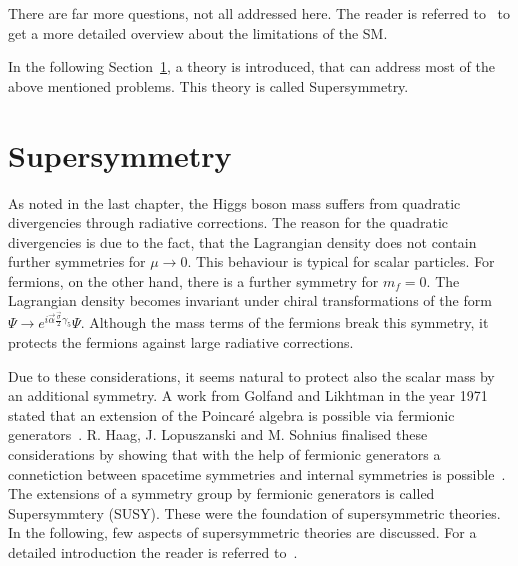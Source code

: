 There are far more questions, not all addressed here.
The reader is referred to~\cite{FIXME} to get a more detailed overview about the limitations of the SM.

In the following Section~\ref{sec:Supersymmetry}, a theory is introduced, that can address most of the above mentioned problems.
This theory is called Supersymmetry.


\chapter{Supersymmetry}
\label{sec:Supersymmetry}

As noted in the last chapter, the Higgs boson mass suffers from quadratic divergencies through radiative corrections.
The reason for the quadratic divergencies is due to the fact, that the Lagrangian density does not contain further symmetries for $\mu\rightarrow 0 $.
This behaviour is typical for scalar particles.
For fermions, on the other hand, there is a further symmetry for $m_f=0$. 
The Lagrangian density becomes invariant under chiral transformations of the form $\Psi \rightarrow e^{i\vec{\alpha}\frac{\vec{\sigma}}{2} \gamma_5} \Psi$.
Although the mass terms of the fermions break this symmetry, it protects the fermions against large radiative corrections.

Due to these considerations, it seems natural to protect also the scalar mass by an additional symmetry.
A work from Golfand and Likhtman in the year 1971 stated that an extension of the Poincar\'e  algebra is possible via fermionic generators~\cite{bib:Golfand_Likhtman_1971}.
R. Haag, J. Lopuszanski and M. Sohnius finalised these considerations by showing that with the help of fermionic generators a connetiction between spacetime symmetries and internal symmetries is possible~\cite{bib:Haag_1974}.
The extensions of a symmetry group by fermionic generators is called Supersymmtery (SUSY).
These were the foundation of supersymmetric theories.\\

In the following, few aspects of supersymmetric theories are discussed.
For a detailed introduction the reader is referred to~\cite{bib:Drees_1996,bib:Aitchison_2005,bib:Drees_2004}.

